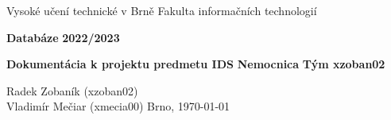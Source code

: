 \documentclass[12pt,a4paper]{article}
\begin{document}
    \pagestyle{empty}
    \begin{titlepage}
        \begin{center}
            \normalsize{Vysoké učení technické v Brně\linebreak}
            \normalsize{Fakulta informačních technologií}

            \vfill

            \large\textbf{Databáze\linebreak}
            \large\textbf{2022/2023}

            \vfill

            \LARGE\textbf{Dokumentácia k projektu predmetu IDS\linebreak}
            \LARGE\textbf{Nemocnica\linebreak}
            \large\textbf{Tým xzoban02}

            \vfill
            \vfill
            \vfill


            \begin{flushleft}
                \large
                Radek Zobaník (xzoban02)\\
                Vladimír Mečiar (xmecia00)
                \hfill
                Brno, \today
            \end{flushleft}
        \end{center}
    \end{titlepage}
    \pagestyle{plain}
    \newpage

    \tableofcontents

    \listoffigures
    \listoftables

    
    
    
    
    
    
    
    
    
    
\end{document}
